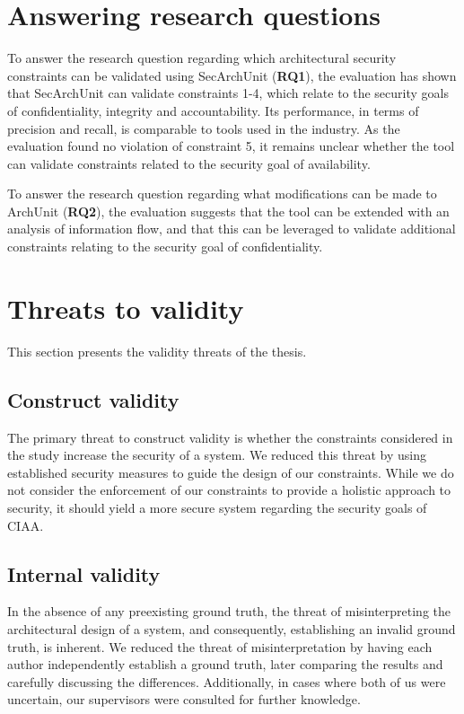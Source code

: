 

\section{Answering research questions}
To answer the research question regarding which architectural security constraints can be validated using SecArchUnit (\textbf{RQ1}), the evaluation has shown that SecArchUnit can validate constraints 1-4, which relate to the security goals of confidentiality, integrity and accountability. Its performance, in terms of precision and recall, is comparable to tools used in the industry. As the evaluation found no violation of constraint 5, it remains unclear whether the tool can validate constraints related to the security goal of availability.

To answer the research question regarding what modifications can be made to ArchUnit (\textbf{RQ2}), the evaluation suggests that the tool can be extended with an analysis of information flow, and that this can be leveraged to validate additional constraints relating to the security goal of confidentiality.



\section{Threats to validity}
This section presents the validity threats of the thesis. 

\subsection{Construct validity}
The primary threat to construct validity is whether the constraints considered in the study increase the security of a system. We reduced this threat by using established security measures to guide the design of our constraints. While we do not consider the enforcement of our constraints to provide a holistic approach to security, it should yield a more secure system regarding the security goals of CIAA.


\subsection{Internal validity}
In the absence of any preexisting ground truth, the threat of misinterpreting the architectural design of a system, and consequently, establishing an invalid ground truth, is inherent. We reduced the threat of misinterpretation by having each author independently establish a ground truth, later comparing the results and carefully discussing the differences. Additionally, in cases where both of us were uncertain, our supervisors were consulted for further knowledge.


